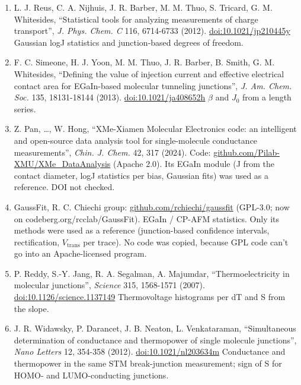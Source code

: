 \documentclass[
  11pt,
  a4paper,
]{article}
\begin{document}
\begin{enumerate}
  Numerical integration vs approximate formulas; see the comment by I.
  Baldea, \emph{Phys. Chem. Chem. Phys.} 26, 7230 (2024),
  \href{https://doi.org/10.1039/D2CP05110A}{doi:10.1039/D2CP05110A}.
\item
  L. J. Reus, C. A. Nijhuis, J. R. Barber, M. M. Thuo, S. Tricard, G. M.
  Whitesides, ``Statistical tools for analyzing measurements of charge
  transport'', \emph{J. Phys. Chem. C} 116, 6714-6733 (2012).
  \href{https://doi.org/10.1021/jp210445y}{doi:10.1021/jp210445y}
  Gaussian log\textbar J\textbar{} statistics and junction-based degrees
  of freedom.
\item
  F. C. Simeone, H. J. Yoon, M. M. Thuo, J. R. Barber, B. Smith, G. M.
  Whitesides, ``Defining the value of injection current and effective
  electrical contact area for EGaIn-based molecular tunneling
  junctions'', \emph{J. Am. Chem. Soc.} 135, 18131-18144 (2013).
  \href{https://doi.org/10.1021/ja408652h}{doi:10.1021/ja408652h}
  $\beta$ and $J_0$ from a length series.
\item
  Z. Pan, \ldots, W. Hong, ``XMe-Xiamen Molecular Electronics code: an
  intelligent and open-source data analysis tool for single-molecule
  conductance measurements'', \emph{Chin. J. Chem.} 42, 317 (2024).
  Code:
  \href{https://github.com/Pilab-XMU/XMe_DataAnalysis}{github.com/Pilab-XMU/XMe\_DataAnalysis}
  (Apache 2.0). Its EGaIn module (J from the contact diameter,
  log\textbar J\textbar{} statistics per bias, Gaussian fits) was used
  as a reference. DOI not checked.
\item
  GaussFit, R. C. Chiechi group:
  \href{https://github.com/rchiechi/gaussfit}{github.com/rchiechi/gaussfit}
  (GPL-3.0; now on codeberg.org/rcclab/GaussFit). EGaIn / CP-AFM
  statistics. Only its methods were used as a reference (junction-based
  confidence intervals, rectification, $V_\mathrm{trans}$ per trace). No
  code was copied, because GPL code can't go into an Apache-licensed
  program.
\item
  P. Reddy, S.-Y. Jang, R. A. Segalman, A. Majumdar, ``Thermoelectricity
  in molecular junctions'', \emph{Science} 315, 1568-1571 (2007).
  \href{https://doi.org/10.1126/science.1137149}{doi:10.1126/science.1137149}
  Thermovoltage histograms per dT and S from the slope.
\item
  J. R. Widawsky, P. Darancet, J. B. Neaton, L. Venkataraman,
  ``Simultaneous determination of conductance and thermopower of single
  molecule junctions'', \emph{Nano Letters} 12, 354-358 (2012).
  \href{https://doi.org/10.1021/nl203634m}{doi:10.1021/nl203634m}
  Conductance and thermopower in the same STM break-junction
  measurement; sign of S for HOMO- and LUMO-conducting junctions.
\end{enumerate}
\end{document}
